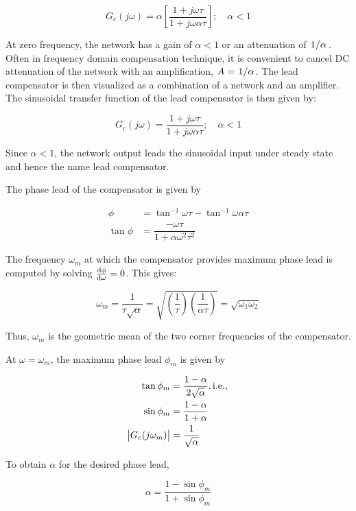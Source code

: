 \documentclass[
  14pt,
  a4paper,
  oneside,
  open=any,
  a4paper,
  14pt]{report}
\begin{document}
\[
    G_c(j\omega) = \alpha \left[\dfrac{1+j\omega\tau}{1+j\omega\alpha\tau} \right]; \quad \alpha < 1
\]

At zero frequency, the network has a gain of \(\alpha < 1\) or an
attenuation of \(\left.1\middle\slash\alpha\right.\). Often in frequency domain
compensation technique, it is convenient to cancel DC attenuation of the
network with an amplification, \(A=\left.1\middle\slash\alpha\right.\). The lead
compensator is then visualized as a combination of a network and an
amplifier. The sinusoidal transfer function of the lead compensator is
then given by:

\[
    G_c(j\omega) =  \dfrac{1+j\omega\tau}{1+j\omega\alpha\tau}; \quad \alpha < 1
\]

Since \(\alpha < 1\), the network output leads the sinusoidal input
under steady state and hence the name lead compensator.

\newpage{}

The phase lead of the compensator is given by

\[
\begin{aligned}
    \phi &= \tan^{-1}\omega\tau - \tan^{-1}\omega\alpha\tau \\
    \tan\phi &= \dfrac{-\omega\tau}{1+\alpha\omega^2\tau^2}
\end{aligned}
\]

The frequency \(\omega_m\) at which the compensator provides maximum
phase lead is computed by solving \(\odv{\phi}{\omega}=0\). This gives:

\[
    \omega_m = \dfrac{1}{\tau \sqrt{\alpha}} = \sqrt{\left(\dfrac{1}{\tau}\right)\left(\dfrac{1}{\alpha\tau}\right)} = \sqrt{\omega_1\omega_2}
\]

Thus, \(\omega_m\) is the geometric mean of the two corner frequencies
of the compensator.

At \(\omega = \omega_m\), the maximum phase lead \(\phi_m\) is given by

\[
\begin{aligned}
    \tan\phi_m &= \dfrac{1-\alpha}{2\sqrt{\alpha}}, \text{i.e.}, \\
    \sin\phi_m &= \dfrac{1-\alpha}{1+\alpha} \\
    \abs{G_c(j\omega_m)} &= \dfrac{1}{\sqrt{\alpha}}
\end{aligned}
\]

To obtain \(\alpha\) for the desired phase lead,

\[
    \alpha = \dfrac{1-\sin\phi_m}{1+\sin\phi_m}
\]

\newpage{}
\end{document}
